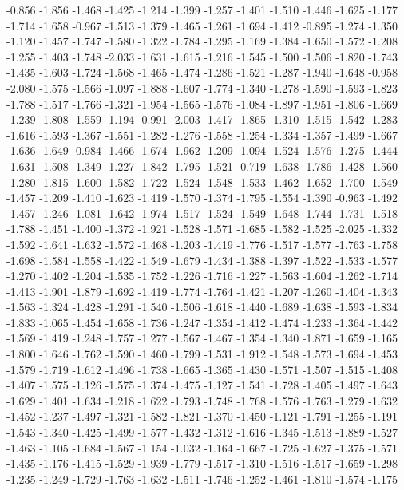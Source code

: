 \documentclass[9pt]{article}
\theoremstyle{plain}
\theoremstyle{definition}
\theoremstyle{remark}
\numberwithin{equation}{section}
\begin{document}
-0.856
-1.856
-1.468
-1.425
-1.214
-1.399
-1.257
-1.401
-1.510
-1.446
-1.625
-1.177
-1.714
-1.658
-0.967
-1.513
-1.379
-1.465
-1.261
-1.694
-1.412
-0.895
-1.274
-1.350
-1.120
-1.457
-1.747
-1.580
-1.322
-1.784
-1.295
-1.169
-1.384
-1.650
-1.572
-1.208
-1.255
-1.403
-1.748
-2.033
-1.631
-1.615
-1.216
-1.545
-1.500
-1.506
-1.820
-1.743
-1.435
-1.603
-1.724
-1.568
-1.465
-1.474
-1.286
-1.521
-1.287
-1.940
-1.648
-0.958
-2.080
-1.575
-1.566
-1.097
-1.888
-1.607
-1.774
-1.340
-1.278
-1.590
-1.593
-1.823
-1.788
-1.517
-1.766
-1.321
-1.954
-1.565
-1.576
-1.084
-1.897
-1.951
-1.806
-1.669
-1.239
-1.808
-1.559
-1.194
-0.991
-2.003
-1.417
-1.865
-1.310
-1.515
-1.542
-1.283
-1.616
-1.593
-1.367
-1.551
-1.282
-1.276
-1.558
-1.254
-1.334
-1.357
-1.499
-1.667
-1.636
-1.649
-0.984
-1.466
-1.674
-1.962
-1.209
-1.094
-1.524
-1.576
-1.275
-1.444
-1.631
-1.508
-1.349
-1.227
-1.842
-1.795
-1.521
-0.719
-1.638
-1.786
-1.428
-1.560
-1.280
-1.815
-1.600
-1.582
-1.722
-1.524
-1.548
-1.533
-1.462
-1.652
-1.700
-1.549
-1.457
-1.209
-1.410
-1.623
-1.419
-1.570
-1.374
-1.795
-1.554
-1.390
-0.963
-1.492
-1.457
-1.246
-1.081
-1.642
-1.974
-1.517
-1.524
-1.549
-1.648
-1.744
-1.731
-1.518
-1.788
-1.451
-1.400
-1.372
-1.921
-1.528
-1.571
-1.685
-1.582
-1.525
-2.025
-1.332
-1.592
-1.641
-1.632
-1.572
-1.468
-1.203
-1.419
-1.776
-1.517
-1.577
-1.763
-1.758
-1.698
-1.584
-1.558
-1.422
-1.549
-1.679
-1.434
-1.388
-1.397
-1.522
-1.533
-1.577
-1.270
-1.402
-1.204
-1.535
-1.752
-1.226
-1.716
-1.227
-1.563
-1.604
-1.262
-1.714
-1.413
-1.901
-1.879
-1.692
-1.419
-1.774
-1.764
-1.421
-1.207
-1.260
-1.404
-1.343
-1.563
-1.324
-1.428
-1.291
-1.540
-1.506
-1.618
-1.440
-1.689
-1.638
-1.593
-1.834
-1.833
-1.065
-1.454
-1.658
-1.736
-1.247
-1.354
-1.412
-1.474
-1.233
-1.364
-1.442
-1.569
-1.419
-1.248
-1.757
-1.277
-1.567
-1.467
-1.354
-1.340
-1.871
-1.659
-1.165
-1.800
-1.646
-1.762
-1.590
-1.460
-1.799
-1.531
-1.912
-1.548
-1.573
-1.694
-1.453
-1.579
-1.719
-1.612
-1.496
-1.738
-1.665
-1.365
-1.430
-1.571
-1.507
-1.515
-1.408
-1.407
-1.575
-1.126
-1.575
-1.374
-1.475
-1.127
-1.541
-1.728
-1.405
-1.497
-1.643
-1.629
-1.401
-1.634
-1.218
-1.622
-1.793
-1.748
-1.768
-1.576
-1.763
-1.279
-1.632
-1.452
-1.237
-1.497
-1.321
-1.582
-1.821
-1.370
-1.450
-1.121
-1.791
-1.255
-1.191
-1.543
-1.340
-1.425
-1.499
-1.577
-1.432
-1.312
-1.616
-1.345
-1.513
-1.889
-1.527
-1.463
-1.105
-1.684
-1.567
-1.154
-1.032
-1.164
-1.667
-1.725
-1.627
-1.375
-1.571
-1.435
-1.176
-1.415
-1.529
-1.939
-1.779
-1.517
-1.310
-1.516
-1.517
-1.659
-1.298
-1.235
-1.249
-1.729
-1.763
-1.632
-1.511
-1.746
-1.252
-1.461
-1.810
-1.574
-1.175
\end{document}
